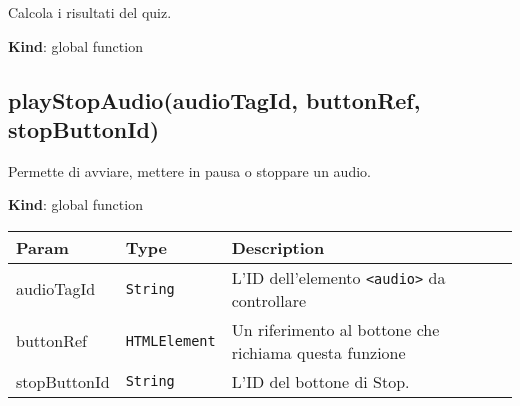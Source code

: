 Calcola i risultati del quiz.

\textbf{Kind}: global function\\
\protect\hypertarget{playStopAudio}{}{}

\hypertarget{playstopaudioaudiotagid-buttonref-stopbuttonid}{%
\subsection{playStopAudio(audioTagId, buttonRef,
stopButtonId)}\label{playstopaudioaudiotagid-buttonref-stopbuttonid}}

Permette di avviare, mettere in pausa o stoppare un audio.

\textbf{Kind}: global function

\begin{longtabu} to \textwidth {X[1,L,m]X[1,L,m]X[1.5,L,m]}
\toprule
\begin{minipage}[b]{0.30\columnwidth}\raggedright
Param\strut
\end{minipage} & \begin{minipage}[b]{0.30\columnwidth}\raggedright
Type\strut
\end{minipage} & \begin{minipage}[b]{0.30\columnwidth}\raggedright
Description\strut
\end{minipage}\tabularnewline
\midrule
\endhead
\begin{minipage}[t]{0.30\columnwidth}\raggedright
audioTagId\strut
\end{minipage} & \begin{minipage}[t]{0.30\columnwidth}\raggedright
\texttt{String}\strut
\end{minipage} & \begin{minipage}[t]{0.30\columnwidth}\raggedright
L'ID dell'elemento \texttt{\textless{}audio\textgreater{}} da
controllare\strut
\end{minipage}\tabularnewline
\begin{minipage}[t]{0.30\columnwidth}\raggedright
buttonRef\strut
\end{minipage} & \begin{minipage}[t]{0.30\columnwidth}\raggedright
\texttt{HTMLElement}\strut
\end{minipage} & \begin{minipage}[t]{0.30\columnwidth}\raggedright
Un riferimento al bottone che richiama questa funzione\strut
\end{minipage}\tabularnewline
\begin{minipage}[t]{0.30\columnwidth}\raggedright
stopButtonId\strut
\end{minipage} & \begin{minipage}[t]{0.30\columnwidth}\raggedright
\texttt{String}\strut
\end{minipage} & \begin{minipage}[t]{0.30\columnwidth}\raggedright
L'ID del bottone di Stop.\strut
\end{minipage}\tabularnewline
\bottomrule
\end{longtabu}

